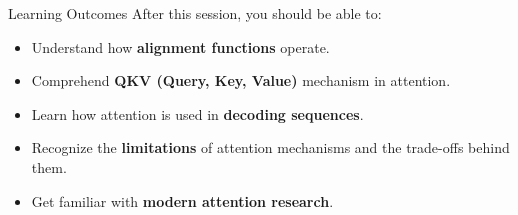 \begin{frame}{Learning Outcomes}
  After this session, you should be able to:
  \begin{itemize}
    \item Understand how \textbf{alignment functions} operate.
    \item Comprehend \textbf{QKV (Query, Key, Value)} mechanism in attention.
    \item Learn how attention is used in \textbf{decoding sequences}.
    \item Recognize the \textbf{limitations} of attention mechanisms and the trade-offs behind them.
    \item Get familiar with \textbf{modern attention research}.
  \end{itemize}
\end{frame}